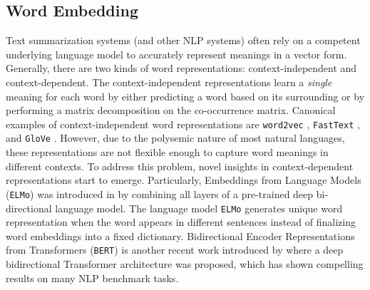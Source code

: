 \subsection{Word Embedding}

Text summarization systems (and other NLP systems) often rely on a competent underlying language model to accurately represent meanings in a vector form. Generally, there are two kinds of word representations: context-independent and context-dependent. The context-independent representations learn a \textit{single} meaning for each word by either predicting a word based on its surrounding or by performing a matrix decomposition on the co-occurrence matrix. Canonical examples of context-independent word representations are \texttt{word2vec} \cite{mikolov2013efficient}, \texttt{FastText} \cite{bojanowski2017enriching}, and \texttt{GloVe} \cite{pennington2014glove}. However, due to the polysemic nature of most natural languages, these representations are not flexible enough to capture word meanings in different contexts. To address this problem, novel insights in context-dependent representations start to emerge. Particularly, Embeddings from Language Models (\texttt{ELMo}) was introduced in \cite{peters2018deep} by combining all layers of a pre-trained deep bi-directional language model. The language model \texttt{ELMo} generates unique word representation when the word appears in different sentences instead of finalizing word embeddings into a fixed dictionary. Bidirectional Encoder Representations from Transformers (\texttt{BERT}) is another recent work introduced by \cite{devlin2018bert} where a deep bidirectional Transformer architecture was proposed, which has shown compelling results on many NLP benchmark tasks.  

